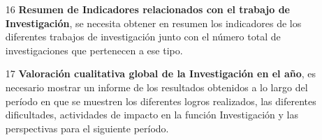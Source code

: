 \documentclass[12pt,letterpaper]{report}
\begin{document}
\begin{itemize}
\item[16]{
\textbf{Resumen de Indicadores relacionados con el trabajo de Investigación}, se necesita obtener en resumen los indicadores de los diferentes trabajos de investigación junto con el número total de investigaciones que pertenecen a ese tipo.
}


\item[17]{
\textbf{Valoración cualitativa global de la Investigación en el año}, es necesario mostrar un informe de los resultados obtenidos a lo largo del período en que se muestren los diferentes logros realizados, las diferentes dificultades, actividades de impacto en la función Investigación y las perspectivas para el siguiente período.
}
\end{itemize}
\end{document}
